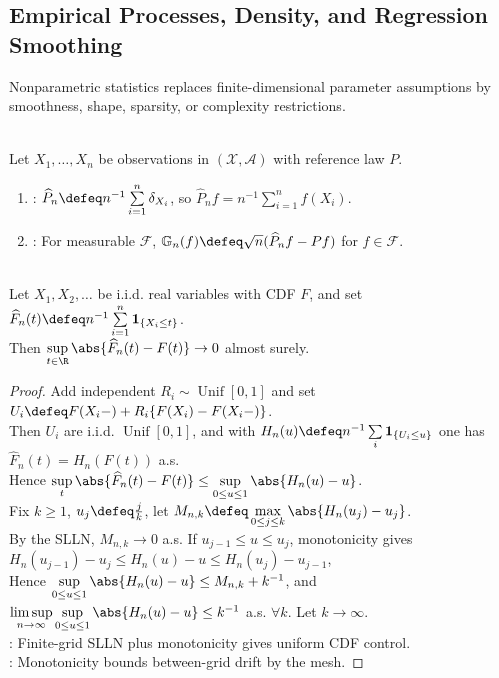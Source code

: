 \subsection{Empirical Processes, Density, and Regression Smoothing}

Nonparametric statistics replaces finite-dimensional parameter assumptions by smoothness, shape, sparsity, or complexity restrictions.

\begin{definition} \label{def:empirical-measure-and-process} \\
Let $X_1,\ldots,X_n$ be observations in $(\mathcal{X},\mathcal{A})$ with reference law $P$.
\begin{enumerate}[label=(\roman*)]
\setlength{\itemsep}{0pt}
\item {}: $\widehat{P}_n\defeq n^{-1}\sum\limits_{i=1}^n\delta_{X_i}$, so $\widehat{P}_nf=n^{-1}\sum\limits_{i=1}^nf(X_i)$.
\item {}: For measurable $\mathcal{F}$, $\mathbb{G}_n(f)\defeq\sqrt{n}(\widehat{P}_nf-Pf)$ for $f\in\mathcal{F}$.
\end{enumerate}
\end{definition}

\begin{theorem} \label{thm:glivenko-cantelli} \\
Let $X_1,X_2,\ldots$ be i.i.d. real variables with CDF $F$, and set $\widehat{F}_n(t)\defeq n^{-1}\sum\limits_{i=1}^n\mathbf{1}_{\{X_i\leq t\}}$.\\
Then $\sup\limits_{t\in\R}\abs{\widehat{F}_n(t)-F(t)}\to0$ almost surely.
\begin{proof} Add independent $R_i\sim\operatorname{Unif}[0,1]$ and set $U_i\defeq F(X_i-)+R_i\{F(X_i)-F(X_i-)\}$.\\
Then $U_i$ are i.i.d. $\operatorname{Unif}[0,1]$, and with $H_n(u)\defeq n^{-1}\sum\limits_i\mathbf{1}_{\{U_i\leq u\}}$ one has $\widehat{F}_n(t)=H_n(F(t))$ a.s.\\
Hence $\sup\limits_t\abs{\widehat{F}_n(t)-F(t)}\leq\sup\limits_{0\leq u\leq1}\abs{H_n(u)-u}$.\\
Fix $k\geq1$, $u_j\defeq\frac{j}{k}$, let $M_{n,k}\defeq\max\limits_{0\leq j\leq k}\abs{H_n(u_j)-u_j}$.\\
By the SLLN, $M_{n,k}\to0$ a.s. If $u_{j-1}\leq u\leq u_j$, monotonicity gives $H_n(u_{j-1})-u_j\leq H_n(u)-u\leq H_n(u_j)-u_{j-1}$,\\
Hence $\sup\limits_{0\leq u\leq1}\abs{H_n(u)-u}\leq M_{n,k}+k^{-1}$, and $\limsup\limits_{n\to\infty}\sup\limits_{0\leq u\leq1}\abs{H_n(u)-u}\leq k^{-1}$ a.s. $\forall k$. Let $k\to\infty$.\\
: Finite-grid SLLN plus monotonicity gives uniform CDF control.\\
: Monotonicity bounds between-grid drift by the mesh.
\end{proof}
\end{theorem}

